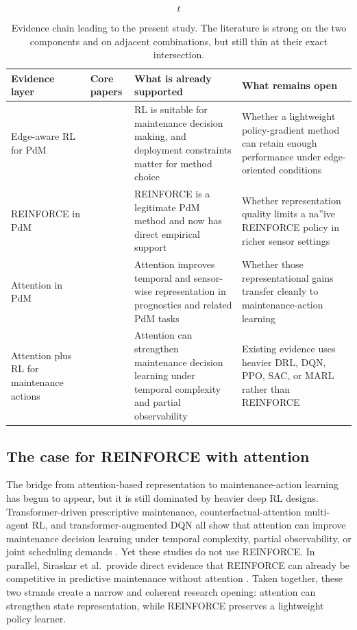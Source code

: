 \begin{table}\[t\] \centering \small \begin{tabular}{p{} p{} p{} p{}} \hline Evidence layer & Core papers & What is already supported & What remains open \\ \hline Edge-aware RL for PdM & \cite{Wan14,Ads20,You20,Ong22,Ong22b} & RL is suitable for maintenance decision making, and deployment constraints matter for method choice & Whether a lightweight policy-gradient method can retain enough performance under edge-oriented conditions \\ REINFORCE in PdM & \cite{Sir25,Sir23} & REINFORCE is a legitimate PdM method and now has direct empirical support & Whether representation quality limits a na”ive REINFORCE policy in richer sensor settings \\ Attention in PdM & \cite{Che20b,Che21e,Cha22,Luc23,Xia22} & Attention improves temporal and sensor-wise representation in prognostics and related PdM tasks & Whether those representational gains transfer cleanly to maintenance-action learning \\ Attention plus RL for maintenance actions & \cite{Zha23d,Zha23f,Guo26} & Attention can strengthen maintenance decision learning under temporal complexity and partial observability & Existing evidence uses heavier DRL, DQN, PPO, SAC, or MARL rather than REINFORCE \\ \hline \end{tabular} \caption{Evidence chain leading to the present study. The literature is strong on the two components and on adjacent combinations, but still thin at their exact intersection.} \label{tab:evidence_chain} \end{table}

\subsection{The case for REINFORCE with attention}

The bridge from attention-based representation to maintenance-action learning has begun to appear, but it is still dominated by heavier deep RL designs. Transformer-driven prescriptive maintenance, counterfactual-attention multi-agent RL, and transformer-augmented DQN all show that attention can improve maintenance decision learning under temporal complexity, partial observability, or joint scheduling demands \cite{Zha23d,Zha23f,Guo26}. Yet these studies do not use REINFORCE. In parallel, Siraskar et al. provide direct evidence that REINFORCE can already be competitive in predictive maintenance without attention \cite{Sir25}. Taken together, these two strands create a narrow and coherent research opening: attention can strengthen state representation, while REINFORCE preserves a lightweight policy learner.

